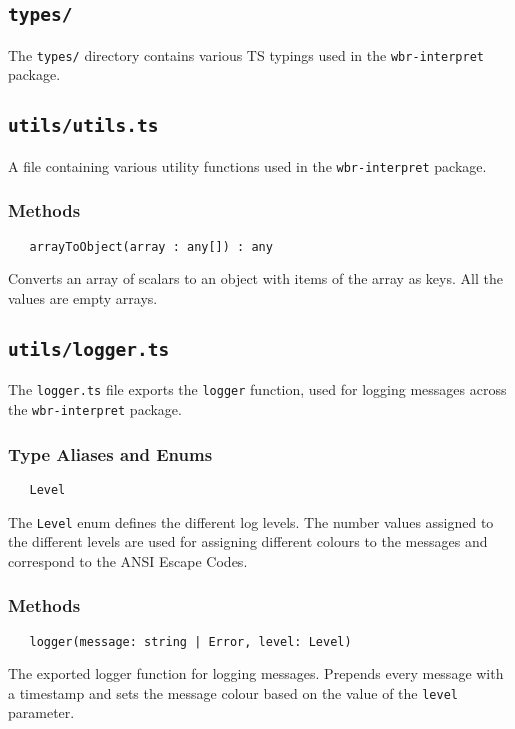 \subsection{\texttt{types/}}

The \texttt{types/} directory contains various \acs{TS} typings used in the \texttt{wbr-interpret} package.

\subsection{\texttt{utils/utils.ts}}

A file containing various utility functions used in the \texttt{wbr-interpret} package.

\subsubsection{Methods}

\verb|   arrayToObject(array : any[]) : any|

Converts an array of scalars to an object with items of the array as keys.
All the values are empty arrays.

\subsection{\texttt{utils/logger.ts}}

The \texttt{logger.ts} file exports the \texttt{logger} function, used for logging messages across the \texttt{wbr-interpret} package.

\subsubsection{Type Aliases and Enums}

\verb|   Level|

\smallskip

The \texttt{Level} enum defines the different log levels.
The number values assigned to the different levels are used for assigning different colours to the messages
and correspond to the ANSI Escape Codes.

\subsubsection{Methods}

\verb$   logger(message: string | Error, level: Level)$

The exported logger function for logging messages.
Prepends every message with a timestamp and sets the message colour based on the value of the \texttt{level} parameter.

